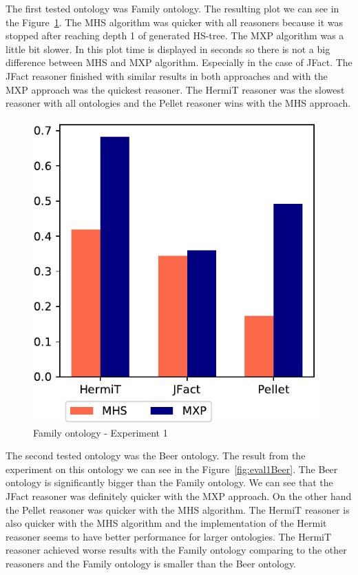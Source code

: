 \documentclass[12pt,a4paper]{article}
\begin{document}
The first tested ontology was Family ontology. The resulting plot we can see in the  Figure~\ref{fig:eval1Family}. The MHS algorithm was quicker with all reasoners because it was stopped after reaching depth 1 of generated HS-tree. The MXP algorithm was a little bit slower. In this plot time is displayed in seconds so there is not a big difference between MHS and MXP algorithm. Especially in the case of JFact. The JFact reasoner finished with similar results in both approaches and with the MXP approach was the quickest reasoner. The HermiT reasoner was the slowest reasoner with all ontologies and the Pellet reasoner wins with the MHS approach.

\begin{figure}[H]
	\centering
	\includegraphics[width=11cm]{eval1Family}
	\caption{Family ontology - Experiment 1}
	\label{fig:eval1Family}
\end{figure}

The second tested ontology was the Beer ontology. The result from the experiment on this ontology we can see in the Figure~\ref{fig:eval1Beer}. The Beer ontology is significantly bigger than the Family ontology. We can see that the JFact reasoner was definitely quicker with the MXP approach. On the other hand the Pellet reasoner was quicker with the MHS algorithm. The HermiT reasoner is also quicker with the MHS algorithm and the implementation of the Hermit reasoner seems to have better performance for larger ontologies. The HermiT reasoner achieved worse results with the Family ontology comparing to the other reasoners and the Family ontology is smaller than the Beer ontology.
\end{document}
